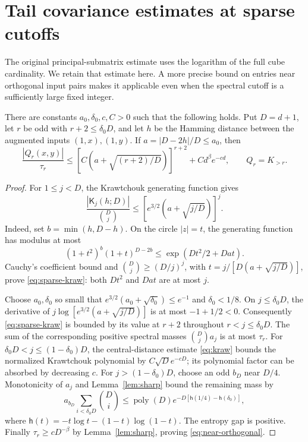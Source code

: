 \section{Tail covariance estimates at sparse cutoffs}\label{sec:sparse-gram}
The original principal-submatrix estimate uses the logarithm of the full
cube cardinality. We retain that estimate here. A more precise bound on
entries near orthogonal input pairs makes it applicable even when the
spectral cutoff is a sufficiently large fixed integer.

\begin{lemma}\label{lem:near-orthogonal}
There are constants $a_0,\delta_0,c,C>0$ such that the following holds.
Put $D=d+1$, let $r$ be odd with $r+2\le\delta_0D$, and let $h$ be the
Hamming distance between the augmented inputs $(1,x),(1,y)$.
If $a=|D-2h|/D\le a_0$, then
\begin{equation}\label{eq:near-orthogonal}
 \frac{|Q_r(x,y)|}{\tau_r}
 \le [C(a+\sqrt{(r+2)/D})]^{r+2}+C d^\beta e^{-cd},
 \qquad Q_r=K_{>r}.
\end{equation}
\end{lemma}
\begin{proof}
For $1\le j<D$, the Krawtchouk generating function gives
\begin{equation}\label{eq:sparse-kraw}
 \frac{|\mathsf K_j(h;D)|}{\binom Dj}
 \le [e^{3/2}(a+\sqrt{j/D})]^j.
\end{equation}
Indeed, set $b=\min(h,D-h)$. On the circle $|z|=t$, the generating
function has modulus at most
\[
 (1+t^2)^b(1+t)^{D-2b}\le \exp(Dt^2/2+Dat).
\]
Cauchy's coefficient bound and $\binom Dj\ge(D/j)^j$, with
$t=j/[D(a+\sqrt{j/D})]$, prove \eqref{eq:sparse-kraw}: both $Dt^2$
and $Dat$ are at most $j$.

Choose $a_0,\delta_0$ so small that
$e^{3/2}(a_0+\sqrt{\delta_0})\le e^{-1}$ and $\delta_0<1/8$.
On $j\le\delta_0D$, the derivative of
$j\log[e^{3/2}(a+\sqrt{j/D})]$ is at most $-1+1/2<0$.
Consequently \eqref{eq:sparse-kraw} is bounded by its value at $r+2$
throughout $r<j\le\delta_0D$. The sum of the corresponding positive
spectral masses $\binom Dj a_j$ is at most $\tau_r$.
For $\delta_0D<j\le(1-\delta_0)D$, the central-distance estimate
\eqref{eq:kraw} bounds the normalized Krawtchouk polynomial by
$C\sqrt D e^{-cD}$; its polynomial factor can be absorbed by decreasing
$c$. For $j>(1-\delta_0)D$, choose an odd $b_D$ near $D/4$.
Monotonicity of $a_j$ and Lemma~\ref{lem:sharp} bound the remaining
mass by
\[
 a_{b_D}\sum_{i<\delta_0D}\binom Di
 \le \operatorname{poly}(D)
       e^{-D[\mathsf h(1/4)-\mathsf h(\delta_0)]},
\]
where $\mathsf h(t)=-t\log t-(1-t)\log(1-t)$.
The entropy gap is positive. Finally $\tau_r\ge cD^{-\beta}$ by
Lemma~\ref{lem:sharp}, proving \eqref{eq:near-orthogonal}.
\end{proof}

